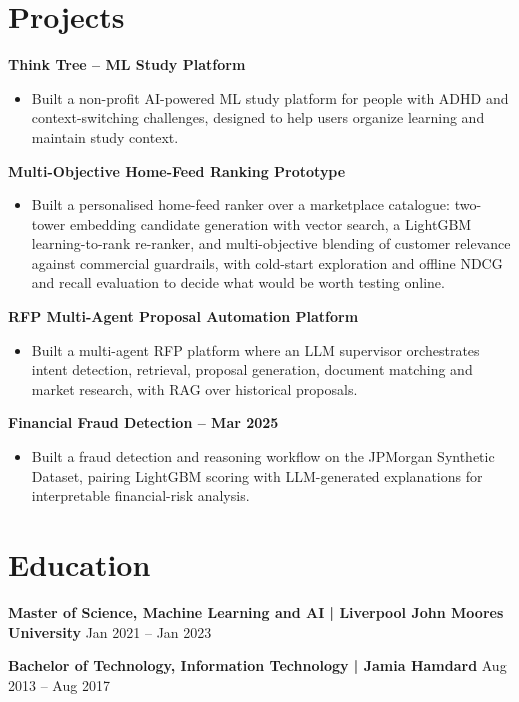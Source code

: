 \documentclass[10pt,a4paper]{article}
\begin{document}
\section{Projects}
\textbf{Think Tree -- ML Study Platform}\par
\begin{itemize}
  \item Built a non-profit AI-powered ML study platform for people with ADHD and context-switching challenges,
  designed to help users organize learning and maintain study context.
\end{itemize}
\textbf{Multi-Objective Home-Feed Ranking Prototype}\par
\begin{itemize}
  \item Built a personalised home-feed ranker over a marketplace catalogue: two-tower embedding candidate generation
  with vector search, a LightGBM learning-to-rank re-ranker, and multi-objective blending of customer relevance
  against commercial guardrails, with cold-start exploration and offline NDCG and recall evaluation to decide what
  would be worth testing online.
\end{itemize}
\textbf{RFP Multi-Agent Proposal Automation Platform}\par
\begin{itemize}
  \item Built a multi-agent RFP platform where an LLM supervisor orchestrates intent detection, retrieval,
  proposal generation, document matching and market research, with RAG over historical proposals.
\end{itemize}
\textbf{Financial Fraud Detection -- Mar 2025}\par
\begin{itemize}
  \item Built a fraud detection and reasoning workflow on the JPMorgan Synthetic Dataset, pairing LightGBM scoring
  with LLM-generated explanations for interpretable financial-risk analysis.
\end{itemize}

\section{Education}
\textbf{Master of Science, Machine Learning and AI | Liverpool John Moores University} \hfill Jan 2021 -- Jan 2023\par
\textbf{Bachelor of Technology, Information Technology | Jamia Hamdard} \hfill Aug 2013 -- Aug 2017\par
\end{document}
